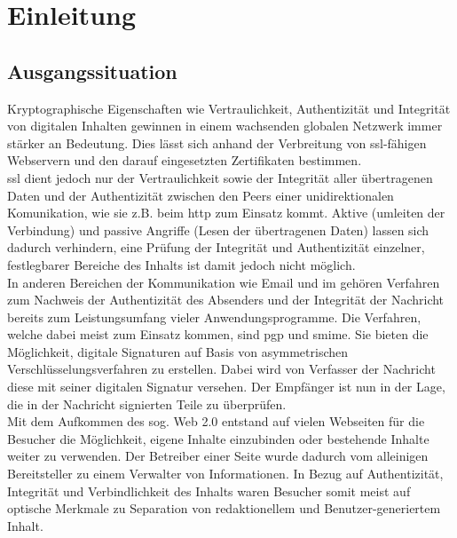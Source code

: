 
\chapter{Einleitung}
%
\label{chp:Einleitung}

\section{Ausgangssituation}
%
\label{sec:Einleitung:ausgangssituation}
Kryptographische Eigenschaften wie Vertraulichkeit, Authentizität und Integrität von digitalen Inhalten gewinnen in einem wachsenden globalen Netzwerk immer
stärker an Bedeutung. Dies lässt sich anhand der Verbreitung von \gls{ssl}-fähigen Webservern und den darauf eingesetzten Zertifikaten bestimmen\cite{ssliverse:eff}.\\

\gls{ssl} dient jedoch nur der Vertraulichkeit sowie der Integrität aller übertragenen Daten und der Authentizität zwischen den Peers einer unidirektionalen
Komunikation, wie sie z.B. beim \gls{http} zum Einsatz kommt. Aktive (umleiten der Verbindung) und passive Angriffe (Lesen der übertragenen Daten) lassen sich dadurch
verhindern, eine Prüfung der Integrität und Authentizität einzelner, festlegbarer Bereiche des Inhalts ist damit jedoch nicht möglich.\\

In anderen Bereichen der Kommunikation wie Email und \gls{im} gehören Verfahren zum Nachweis der Authentizität des Absenders und der Integrität der Nachricht
bereits zum Leistungsumfang vieler Anwendungsprogramme\cite[]{}. Die Verfahren, welche dabei meist zum Einsatz kommen, sind \gls{pgp} und \gls{smime}. Sie bieten die
Möglichkeit, digitale Signaturen auf Basis von asymmetrischen Verschlüsselungsverfahren zu erstellen. Dabei wird von Verfasser der Nachricht diese mit seiner
digitalen Signatur versehen. Der Empfänger ist nun in der Lage, die in der Nachricht signierten Teile zu überprüfen.\\

Mit dem Aufkommen des sog. Web 2.0 entstand auf vielen Webseiten für die Besucher die Möglichkeit, eigene Inhalte einzubinden oder bestehende Inhalte weiter zu
verwenden. Der Betreiber einer Seite wurde dadurch vom alleinigen Bereitsteller zu einem Verwalter von Informationen. In Bezug auf Authentizität, Integrität und
Verbindlichkeit des Inhalts waren Besucher somit meist auf optische Merkmale zu Separation von redaktionellem und Benutzer-generiertem Inhalt. \\

